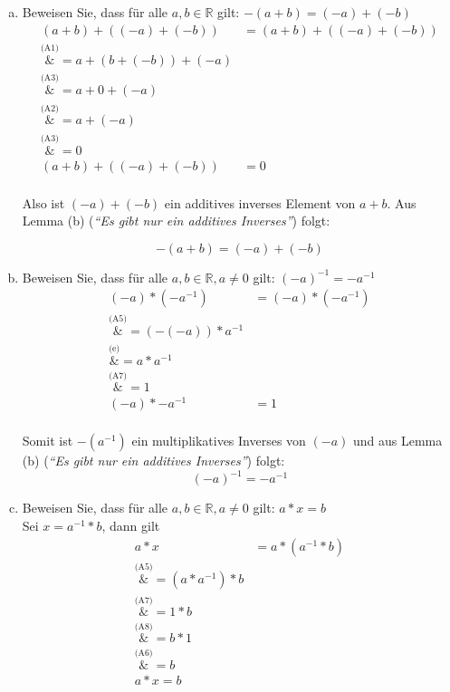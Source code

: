 \documentclass{article}
\begin{document}
\begin{enumerate}[(a)]
\item Beweisen Sie, dass für alle $a, b \in \mathbb{R}$ gilt: $-(a + b) = (-a) + (-b)$ \\

  \begin{align*}
    (a + b) + ((-a) + (-b)) &= (a + b) + ((-a) + (-b)) \\
                            \overset{\text{(A1)}}&{=} a + (b + (-b)) + (-a) \\
                            \overset{\text{(A3)}}&{=} a + 0 + (-a) \\
                            \overset{\text{(A2)}}&{=} a + (-a) \\
                            \overset{\text{(A3)}}&{=} 0 \\
    (a + b) + ((-a) + (-b)) &= 0 \\
  \end{align*}

  Also ist $(-a) + (-b)$ ein additives inverses Element von $a + b$. Aus Lemma (b)
  (\emph{``Es gibt nur ein additives Inverses''}) folgt:

  \[
    -(a + b) = (-a) + (-b)
  \]

\item Beweisen Sie, dass für alle $a, b \in \mathbb{R}, a \ne 0$ gilt: $(-a)^{-1} = -a^{-1}$ \\

  \begin{align*}
    (-a) * (-a^{-1}) &= (-a) * (-a^{-1}) \\
                     \overset{\text{(A5)}}&{=} (-(-a)) * a^{-1} \\
                     \overset{\text{(e)}}&{=} a * a^{-1} \\
                     \overset{\text{(A7)}}&{=} 1\\
    (-a) * -a^{-1} &= 1 \\
  \end{align*}

  Somit ist $-(a^{-1})$ ein multiplikatives Inverses von $(-a)$ und aus Lemma (b)
  (\emph{``Es gibt nur ein additives Inverses''}) folgt:
  \[
    (-a)^{-1} = -a^{-1}
  \]

\item Beweisen Sie, dass für alle $a, b \in \mathbb{R}, a \ne 0$ gilt: $a * x = b$ \\

  Sei $x = a^{-1} * b$, dann gilt
  \begin{align*}
    a * x &= a * (a^{-1} * b) \\
          \overset{\text{(A5)}}&{=} (a * a^{-1}) * b \\
          \overset{\text{(A7)}}&{=} 1 * b \\
          \overset{\text{(A8)}}&{=} b * 1 \\
          \overset{\text{(A6)}}&{=} b\\
    a * x = b \\
  \end{align*}


\end{enumerate}
\end{document}
